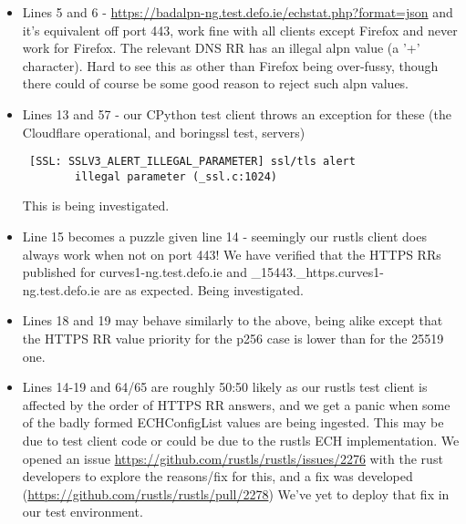 \begin{itemize}

    \item Lines 5 and 6 -
        \url{https://badalpn-ng.test.defo.ie/echstat.php?format=json} and it's
        equivalent off port 443, work fine with all clients except Firefox and
        never work for Firefox. The relevant DNS RR has an illegal alpn value
        (a '+' character). Hard to see this as other than Firefox being
        over-fussy, though there could of course be some good reason to reject
        such alpn values.

    \item Lines 13 and 57 - our CPython test client throws an exception for
        these (the Cloudflare operational, and boringssl test, servers)
        \begin{verbatim} [SSL: SSLV3_ALERT_ILLEGAL_PARAMETER] ssl/tls alert
        illegal parameter (_ssl.c:1024) \end{verbatim} This is being
        investigated.

    \item Line 15 becomes a puzzle given line 14 - seemingly our rustls client
        does always work when not on port 443! We have verified that the HTTPS
        RRs published for curves1-ng.test.defo.ie and
        \_15443.\_https.curves1-ng.test.defo.ie are as expected. Being
        investigated.

    \item Lines 18 and 19 may behave similarly to the above, being alike except
        that the HTTPS RR value priority for the p256 case is lower than for
        the 25519 one.

    \item Lines 14-19 and 64/65 are roughly 50:50 likely as our rustls test
        client is affected by the order of HTTPS RR answers, and we get a panic
        when some of the badly formed ECHConfigList values are being ingested.
        This may be due to test client code or could be due to the rustls ECH
        implementation. We opened an issue
        \url{https://github.com/rustls/rustls/issues/2276} with the rust
        developers to explore the reasons/fix for this, and a fix was developed
        (\url{https://github.com/rustls/rustls/pull/2278}) We've yet to deploy
        that fix in our test environment.


\end{itemize}
